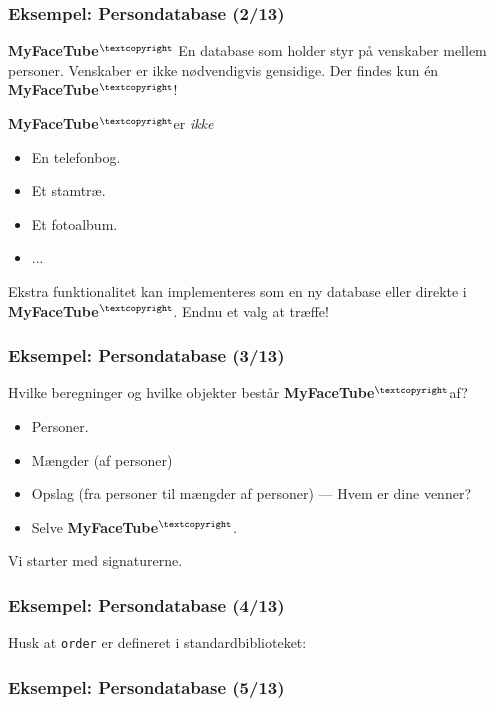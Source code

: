 \documentclass[slidestop,compress,mathserif, xcolor=table]{beamer}
\newcommand{\mft}{\textbf{MyFaceTube$^{\scriptsize{\textcopyright}}$}}
\begin{document}
\begin{frame}
  \frametitle{Eksempel: Persondatabase \quad (2/13)}

  \begin{block}{\mft}
    En database som holder styr på venskaber mellem personer. Venskaber er ikke
    nødvendigvis gensidige.
    \center Der findes kun én \mft!
  \end{block}

  \mft er \textit{ikke}
  \begin{itemize}
  \item En telefonbog.
  \item Et stamtræ.
  \item Et fotoalbum.
  \item ...
  \end{itemize}

  Ekstra funktionalitet kan implementeres som en ny database eller direkte i
  \mft. Endnu et valg at træffe!
\end{frame}

\begin{frame}
  \frametitle{Eksempel: Persondatabase \quad (3/13)}

  Hvilke beregninger og hvilke objekter består \mft af?

  \begin{itemize}
  \item Personer.
  \item Mængder (af personer)
  \item Opslag (fra personer til mængder af personer) --- Hvem er dine venner?
  \item Selve \mft.
  \end{itemize}

  Vi starter med signaturerne.
\end{frame}

\begin{frame}[fragile]
  \frametitle{Eksempel: Persondatabase \quad (4/13)}
  \begin{block}{}
    
  \end{block}
  Husk at \texttt{order} er defineret i standardbiblioteket:
  \begin{block}{}
    
  \end{block}
\end{frame}

\begin{frame}[fragile]
  \frametitle{Eksempel: Persondatabase \quad (5/13)}
  \begin{block}{}
    
  \end{block}
\end{frame}
\end{document}
